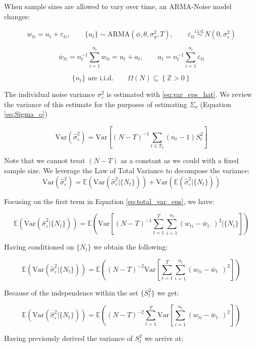 When sample sizes are allowed to vary over time, an ARMA-Noise model changes:

$$ w_{ti} = u_t + \varepsilon_{ti}, \qquad \{u_t\} \sim \text{ARMA}(\phi,\theta,\sigma_\eta^2,T), \qquad \varepsilon_{ti}\overset{\text{i.i.d.}}{\sim}N(0,\sigma_\varepsilon^2)$$

$$ \bar{w}_{ti} = n_t^{-1}\sum_{i = 1}^{n_t}w_{ti} =  u_t + a_t, \qquad a_t = n_t^{-1}\sum_{i=1}^{n_t}\varepsilon_{ti}$$

$$ \{n_t\} \text{ are i.i.d.} \qquad \Omega(N) \subseteq \left\{\mathbb{Z}>0\right\} $$

The individual noise variance $\sigma_\varepsilon^2$ is estimated with \ref{eq:var_eps_hat}. We review the variance of this estimate for the purposes of estimating $\Sigma_o$ (Equation \ref{eq:Sigma_o}) 

$$ \text{Var}(\hat{\sigma}_\varepsilon^2) = \text{Var}\left[(N-T)^{-1}\sum_{t\in T_2}(n_t-1)S_t^2\right] $$

Note that we cannot treat $(N-T)$ as a constant as we could with a fixed sample size. We leverage the Law of Total Variance to decompose the variance:
\begin{equation}
    \text{Var} (\hat{\sigma}_\varepsilon^2) = \mathbb{E}(\text{Var}(\hat{\sigma}_\varepsilon^2|\{N_t\})) + \text{Var}(\mathbb{E}(\hat{\sigma}_\varepsilon^2|\{N_t\})) 
    \label{eq:total_var_eps}
\end{equation}


Focusing on the first term in Equation \ref{eq:total_var_eps}, we have: 

$$ \mathbb{E}(\text{Var}(\hat{\sigma}_\varepsilon^2|\{N_t\})) = \mathbb{E}\left(\text{Var}\left[(N-T)^{-1}\sum_{t=1}^T\sum_{i=1}^{n_t}(w_{ti}-\bar{w}_{t\cdot})^2|\{N_t\}\right]\right) $$

Having conditioned on $\{N_t\}$ we obtain the following:

$$ \mathbb{E}(\text{Var}(\hat{\sigma}_\varepsilon^2|\{N_t\})) = \mathbb{E}\left((N-T)^{-2}\text{Var}\left[\sum_{t=1}^T\sum_{i=1}^{n_t}(w_{ti}-\bar{w}_{t\cdot})^2\right]\right) $$

Because of the independence within the set $\{S_t^2\}$ we get:

$$ \mathbb{E}(\text{Var}(\hat{\sigma}_\varepsilon^2|\{N_t\})) = \mathbb{E}\left((N-T)^{-2}\sum_{t=1}^T\text{Var}\left[\sum_{i=1}^{n_t}(w_{ti}-\bar{w}_{t\cdot})^2\right]\right) $$

Having previously derived the variance of $S_t^2$ we arrive at:

